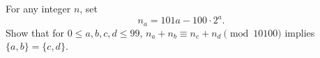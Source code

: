 For any integer $n$, set
\[
n_a = 101a - 100\cdot 2^a.
\]
Show that for $0 \leq a,b,c,d \leq 99$, $n_a + n_b \equiv
n_c + n_d \pmod{10100}$ implies $\{a,b\} = \{c,d\}$.
